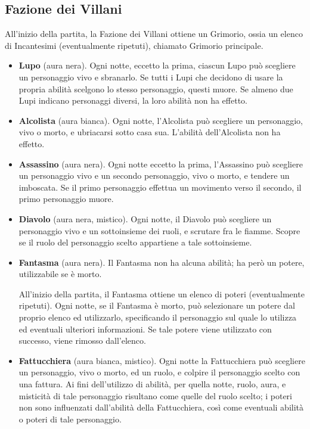 \documentclass[a4paper,10pt]{article}
\begin{document}
\subsection*{Fazione dei Villani}

All'inizio della partita, la Fazione dei Villani ottiene un Grimorio, ossia un elenco di Incantesimi (eventualmente ripetuti), chiamato Grimorio principale.

\begin{itemize}

	\item {\bf Lupo} (aura nera). Ogni notte, eccetto la prima, ciascun Lupo può scegliere un personaggio vivo e sbranarlo. Se tutti i Lupi che decidono di usare la propria abilità scelgono lo stesso personaggio, questi muore. Se almeno due Lupi indicano personaggi diversi, la loro abilità non ha effetto.

	\item {\bf Alcolista} (aura bianca). Ogni notte, l'Alcolista può scegliere un personaggio, vivo o morto, e ubriacarsi sotto casa sua. L'abilità dell'Alcolista non ha effetto.

	\item {\bf Assassino} (aura nera). Ogni notte eccetto la prima, l'Assassino può scegliere un personaggio vivo e un secondo personaggio, vivo o morto, e tendere un imboscata. Se il primo personaggio effettua un movimento verso il secondo, il primo personaggio muore.

	\item {\bf Diavolo} (aura nera, mistico). Ogni notte, il Diavolo può scegliere un personaggio vivo e un sottoinsieme dei ruoli, e scrutare fra le fiamme. Scopre se il ruolo del personaggio scelto appartiene a tale sottoinsieme.

	\item {\bf Fantasma} (aura nera). Il Fantasma non ha alcuna abilità; ha però un potere, utilizzabile se è morto.

	      All'inizio della partita, il Fantasma ottiene un elenco di poteri (eventualmente ripetuti). Ogni notte, se il Fantasma è morto, può selezionare un potere dal proprio elenco ed utilizzarlo, specificando il personaggio sul quale lo utilizza ed eventuali ulteriori informazioni. Se tale potere viene utilizzato con successo, viene rimosso dall'elenco.

	\item {\bf Fattucchiera} (aura bianca, mistico). Ogni notte la Fattucchiera può scegliere un personaggio, vivo o morto, ed un ruolo, e colpire il personaggio scelto con una fattura. Ai fini dell'utilizzo di abilità, per quella notte, ruolo, aura, e misticità di tale personaggio risultano come quelle del ruolo scelto; i poteri non sono influenzati dall'abilità della Fattucchiera, così come eventuali abilità o poteri di tale personaggio.


\end{itemize}
\end{document}
